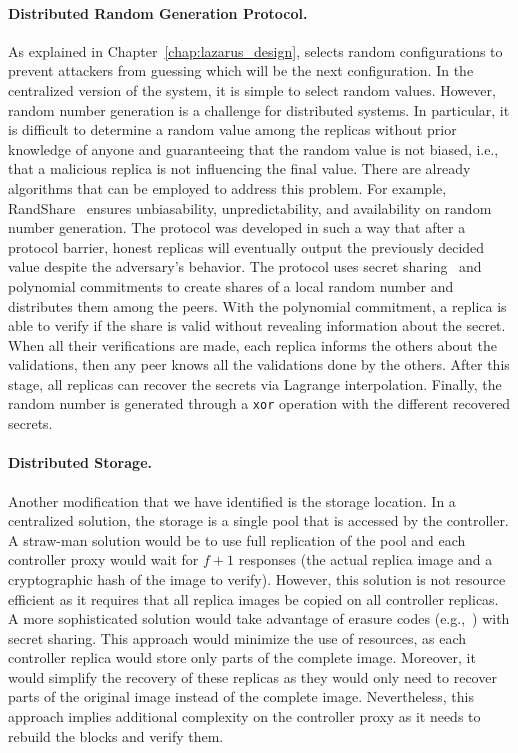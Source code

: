 \paragraph{Distributed Random Generation Protocol.}
As explained in Chapter~\ref{chap:lazarus_design}, \system selects random configurations to prevent attackers from guessing which will be the next configuration.
In the centralized version of the system, it is simple to select random values.
However, random number generation is a challenge for distributed systems.
In particular, it is difficult to determine a random value among the replicas without prior knowledge of anyone and guaranteeing that the random value is not biased, i.e., that a malicious replica is not influencing the final value.
There are already algorithms that can be employed to address this problem.
For example, RandShare~\cite{Syta:2017} ensures unbiasability, unpredictability, and availability on random number generation.
The protocol was developed in such a way that after a protocol barrier, honest replicas will eventually output the previously decided value despite the adversary's behavior.
The protocol uses secret sharing~\cite{Shamir:1979} and polynomial commitments to create shares of a local random number and distributes them among the peers.
With the polynomial commitment, a replica is able to verify if the share is valid without revealing information about the secret.
When all their verifications are made, each replica informs the others about the validations, then any peer knows all the validations done by the others.
After this stage, all replicas can recover the secrets via Lagrange interpolation.
Finally, the random number is generated through a \texttt{xor} operation with the different recovered secrets.


\paragraph{Distributed Storage.}
Another modification that we have identified is the storage location. 
In a centralized solution, the storage is a single pool that is accessed by the controller.
A straw-man solution would be to use full replication of the pool and each controller proxy would wait for $f+1$ responses (the actual replica image and a cryptographic hash of the image to verify).
However, this solution is not resource efficient as it requires that all replica images be copied on all controller replicas.
A more sophisticated solution would take advantage of erasure codes (e.g.,~\cite{Reed:1960}) with secret sharing.
This approach would minimize the use of resources, as each controller replica would store only parts of the complete image.
Moreover, it would simplify the recovery of these replicas as they would only need to recover parts of the original image instead of the complete image.
Nevertheless, this approach implies additional complexity on the controller proxy as it needs to rebuild the blocks and verify them.


